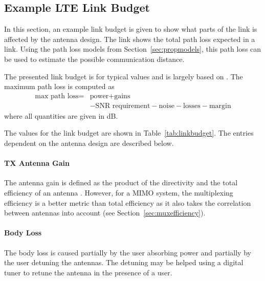 \subsection{Example LTE Link Budget}
\begin{aautop}
In this section, an example link budget is given to show what parts of the link is affected by the antenna design. The link shows the total path loss expected in a link. Using the path loss models from Section~\ref{sec:propmodels}, this path loss can be used to estimate the possible communication distance.
\end{aautop}

The presented link budget is for typical values and is largely based on \cite{holma2011lte}. The maximum path loss is computed as
\begin{equation}
    \label{eq:linkbudget}
    \begin{aligned}
        \text{max path loss} =& \text{power} + \text{gains}\\
        &- \text{SNR requirement} - \text{noise} - \text{losses} - \text{margin}
    \end{aligned}
\end{equation}
where all quantities are given in dB. 

The values for the link budget are shown in Table~\ref{tab:linkbudget}. The entries dependent on the antenna design are described below.

\paragraph{TX Antenna Gain} The antenna gain is defined as the product of the directivity and the total efficiency of an antenna \cite{balanis2012antenna}. However, for a MIMO system, the multiplexing efficiency is a better metric than total efficiency as it also takes the correlation between antennas into account (see Section~\ref{sec:muxefficiency}). %
	
\paragraph{Body Loss} The body loss is caused partially by the user absorbing power and partially by the user detuning the antennas. The detuning may be helped using a digital tuner to retune the antenna in the presence of a user.

